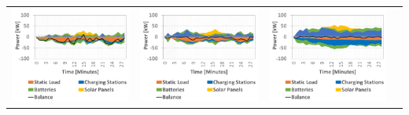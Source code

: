 \begin{table}[b]
\begin{tabularx}{\textwidth}{|Y|Y|Y|Y|}
 		\includegraphics[trim=0 0 0 -3,scale=0.285]{../gfx/data/E1_001.png} &
		\includegraphics[trim=0 0 0 -3,scale=0.285]{../gfx/data/E2_001.png} &
		\includegraphics[trim=0 0 0 -3,scale=0.285]{../gfx/data/E3_001.png}  &

\end{tabularx}
\end{table}
